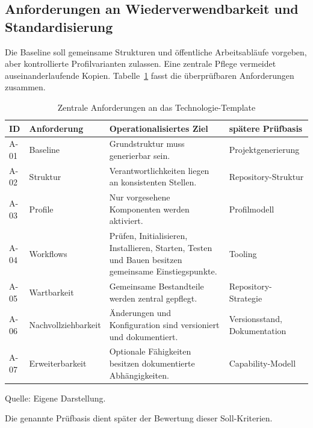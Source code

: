 \subsection{Anforderungen an Wiederverwendbarkeit und Standardisierung}
\label{subsec:wiederverwendbarkeit-standardisierung}

Die Baseline soll gemeinsame Strukturen und öffentliche Arbeitsabläufe
vorgeben, aber kontrollierte Profilvarianten zulassen. Eine zentrale Pflege
vermeidet auseinanderlaufende Kopien. Tabelle~\ref{tab:anforderungen-template}
fasst die überprüfbaren Anforderungen zusammen.

\begin{table}[H]
  \centering
  \scriptsize
  \renewcommand{\arraystretch}{1.08}
  \caption{Zentrale Anforderungen an das Technologie-Template}
  \label{tab:anforderungen-template}
  \begin{tabularx}{\textwidth}{@{}p{}p{}p{}>{\raggedright\arraybackslash}X@{}}
    \toprule
    \textbf{ID} & \textbf{Anforderung} & \textbf{Operationalisiertes Ziel} & \textbf{spätere Prüfbasis} \\
    \midrule
    A-01 & Baseline & Grundstruktur muss generierbar sein. & Projektgenerierung \\
    A-02 & Struktur & Verantwortlichkeiten liegen an konsistenten Stellen. & Repository-Struktur \\
    A-03 & Profile & Nur vorgesehene Komponenten werden aktiviert. & Profilmodell \\
    A-04 & Workflows & Prüfen, Initialisieren, Installieren, Starten, Testen und Bauen besitzen gemeinsame Einstiegspunkte. & Tooling \\
    A-05 & Wartbarkeit & Gemeinsame Bestandteile werden zentral gepflegt. & Repository-Strategie \\
    A-06 & Nachvollziehbarkeit & Änderungen und Konfiguration sind versioniert und dokumentiert. & Versionsstand, Dokumentation \\
    A-07 & Erweiterbarkeit & Optionale Fähigkeiten besitzen dokumentierte Abhängigkeiten. & Capability-Modell \\
    \bottomrule
  \end{tabularx}
  \smallskip
  {\footnotesize Quelle: Eigene Darstellung.\par}
\end{table}

Die genannte Prüfbasis dient später der Bewertung dieser Soll-Kriterien.
